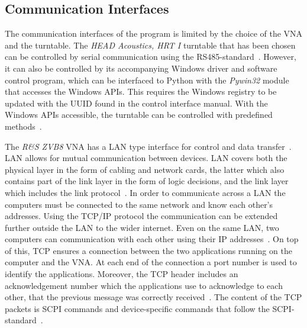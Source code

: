 \subsection{Communication Interfaces} \label{ss:com_interface}
The communication interfaces of the program is limited by the choice of the VNA and the turntable. The \textit{HEAD Acoustics, HRT I} turntable that has been chosen can be controlled by serial communication using the RS485-standard~\cite{hrt_i_data_sheet}. However, it can also be controlled by its accompanying Windows driver and software control program, which can be interfaced to Python with the \textit{Pywin32} module that accesses the Windows APIs. This requires the Windows registry to be updated with the UUID found in the control interface manual. With the Windows APIs accessible, the turntable can be controlled with predefined methods~\cite{hrt_control_api_manual}. 

The \textit{R\&S ZVB8} VNA has a LAN type interface for control and data transfer~\cite[p. 5.3]{vna_data_sheet_spec}. LAN allows for mutual communication between devices. LAN covers both the physical layer in the form of cabling and network cards, the latter which also contains part of the link layer in the form of logic decisions, and the link layer which includes the link protocol~\cite[p. 153]{tcp_ip}. In order to communicate across a LAN the computers must be connected to the same network and know each other's addresses. Using the TCP/IP protocol the communication can be extended further outside the LAN to the wider internet. Even on the same LAN, two computers can communication with each other using their IP addresses~\cite[p. 174-175]{tcp_ip}. On top of this, TCP ensures a connection between the two applications running on the computer and the VNA. At each end of the connection a port number is used to identify the applications. Moreover, the TCP header includes an acknowledgement number which the applications use to acknowledge to each other, that the previous message was correctly received~\cite[p. 313]{tcp_ip}. The content of the TCP packets is SCPI commands and device-specific commands that follow the SCPI-standard~\cite[p. 5.4]{vna_data_sheet_spec}.



